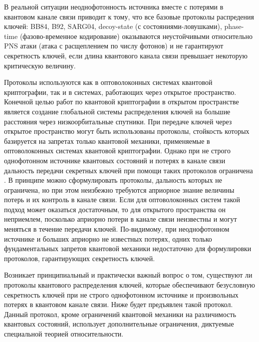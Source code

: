 В реальной ситуации неоднофотонность источника вместе с потерями в квантовом канале связи приводит к тому, что все базовые протоколы распредения ключей: BB84, B92, SARG04, decoy-state (с состояниями-ловушками), phase-time (фазово-временное кодирование) оказываются неустойчивыми относительно PNS атаки (атака с расщеплением по числу фотонов) и не гарантируют секретность ключей, если длина квантового канала связи превышает некоторую критическую величину. 

Протоколы используются как в оптоволоконных системах квантовой криптографии, так и в системах, работающих через открытое пространство.
Конечной целью работ по квантовой криптографии в открытом пространстве является создание глобальной системы распределения ключей на большие расстояния через низкоорбитальные спутники. 
При передаче ключей через открытое пространство могут быть использованы протоколы, стойкость которых базируется на запретах только квантовой механики, применяемые в оптоволоконных системах квантовой криптографии. 
Однако при не строго однофотонном источнике квантовых состояний и потерях в канале связи дальность передачи секретных ключей при помощи таких протоколов ограничена \cite{scarani2009secpraquakeydis}. 
В принципе можно сформулировать протоколы, дальность которых не ограничена, но при этом неизбежно требуются априорное знание величины потерь и их контроль в канале связи. 
Если для оптоволоконных систем такой подход может оказаться достаточным, то для открытого пространства он неприемлем, посколько априорно потери в канале связи неизвестны и могут меняться в течение передачи ключей. По-видимому, при неоднофотонном источнике и больших априорно не известных потерях, одних только фундаментальных запретов квантовой механики недостаточно для формулировки протоколов, гарантирующих секретность ключей.

Возникает принципиальный и практически важный вопрос о том, существуют ли протоколы квантового распределения ключей, которые обеспечивают безусловную секретность ключей при не строго 
однофотонном источнике и произвольных потерях в квантовом канале связи. Ниже будет предъявлен такой протокол. Данный протокол, кроме ограничений квантовой механики на различимость квантовых состояний, использует дополнительные ограничения, диктуемые специальной теорией относительности.
\clearpage